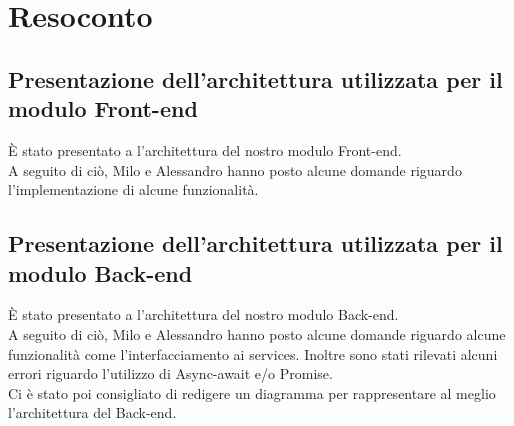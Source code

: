 \section{Resoconto}
\subsection{Presentazione dell'architettura utilizzata per il modulo Front-end}

È stato presentato a \Proponente{} l'architettura del nostro modulo Front-end. \\A seguito di ciò, Milo e Alessandro hanno posto alcune domande riguardo l'implementazione di alcune funzionalità.

\subsection{Presentazione dell'architettura utilizzata per il modulo Back-end}

È stato presentato a \Proponente{} l'architettura del nostro modulo Back-end. \\A seguito di ciò, Milo e Alessandro hanno posto alcune domande riguardo alcune funzionalità come l'interfacciamento ai services. Inoltre sono stati rilevati alcuni errori riguardo l'utilizzo di Async-await e/o Promise. \\Ci è stato poi consigliato di redigere un diagramma per rappresentare al meglio l'architettura del Back-end.
